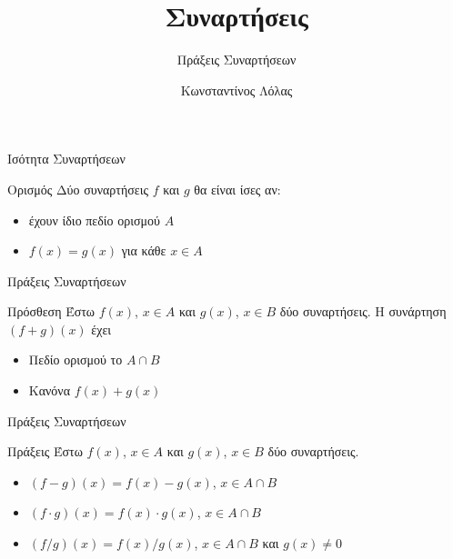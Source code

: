 \documentclass[greek]{beamer}
\title{Συναρτήσεις}
\subtitle{Πράξεις Συναρτήσεων}
\author[Λόλας]{Κωνσταντίνος Λόλας }
\institute[$10^ο$ ΓΕΛ]{$10^ο$ ΓΕΛ Θεσσαλονίκης}
\date{}
\begin{document}
\begin{frame}
      \titlepage
\end{frame}
\begin{frame}{Ισότητα Συναρτήσεων}
      \begin{block}{Ορισμός}
            Δύο συναρτήσεις $f$ και $g$ θα είναι ίσες αν:
            \begin{itemize}
                  \item έχουν ίδιο πεδίο ορισμού $Α$
                  \item $f(x)=g(x)$ για κάθε $x\in Α$
            \end{itemize}
      \end{block}
\end{frame}

\begin{frame}{Πράξεις Συναρτήσεων}
      \begin{block}{Πρόσθεση}
            Έστω $f(x)$, $x\in Α$ και $g(x)$, $x\in Β$ δύο συναρτήσεις. Η συνάρτηση $(f+g)(x)$ έχει
            \begin{itemize}
                  \item Πεδίο ορισμού το $A\cap Β$
                  \item Κανόνα $f(x)+g(x)$
            \end{itemize}
      \end{block}
\end{frame}

\begin{frame}{Πράξεις Συναρτήσεων}
      \begin{block}{Πράξεις}
            Έστω $f(x)$, $x\in Α$ και $g(x)$, $x\in Β$ δύο συναρτήσεις.
            \begin{itemize}
                  \item $(f-g)(x)=f(x)-g(x)$, $x\in A\cap Β$
                  \item $(f\cdot g)(x)=f(x)\cdot g(x)$, $x\in A\cap Β$
                  \item $(f/g)(x)=f(x)/g(x)$, $x\in A\cap Β$ και $g(x)\ne 0$
            \end{itemize}
      \end{block}
\end{frame}
\end{document}
